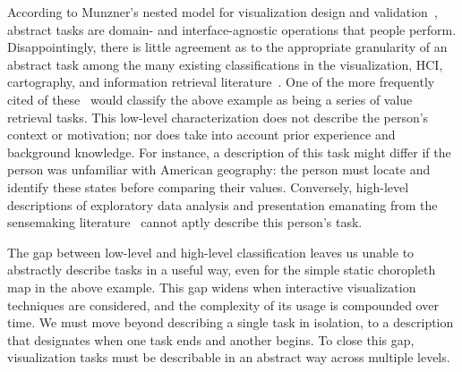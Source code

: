 According to Munzner's nested model for visualization design and validation~\cite{Munzner2009}, abstract tasks are domain- and interface-agnostic operations that people perform.
Disappointingly, there is little agreement as to the appropriate granularity of an abstract task among the many existing classifications in the visualization, \ac{HCI}, cartography, and information retrieval literature~\cite{Amar2005,Amar2004,Andrienko2006,Buja1996,Card1999,Casner1991,Chi1998,Chuah1996,Dix1998,Gotz2008,Heer2012,Keim2002,Klein2006,Lee2006,Liu2010,Mullins1993,Pike2009,Pirolli2005,Raskin2000,Roth2012,Roth2013,Roth1990,Shneiderman1996,Spence2007,Springmeyer1992,Tweedie1997,Valiati2006,Ward2004,Wehrend1990,Yi2007,Zhou1998}.
One of the more frequently cited of these~\cite{Amar2005} would classify the above example as being a series of value retrieval tasks.
This low-level characterization does not describe the person's context or motivation; nor does take into account prior experience and background knowledge.
For instance, a description of this task might differ if the person was unfamiliar with American geography: the person must locate and identify these states before comparing their values.
Conversely, high-level descriptions of exploratory data analysis and presentation emanating from the sensemaking literature~\cite{Amar2004,Card1999,Klein2006,Pirolli2005} cannot aptly describe this person's task.

The gap between low-level and high-level classification leaves us unable to abstractly describe tasks in a useful way, even for the simple static choropleth map in the above example.
This gap widens when interactive visualization techniques are considered, and the complexity of its usage is compounded over time.
We must move beyond describing a single task in isolation, to a description that designates when one task ends and another begins.
To close this gap, visualization tasks must be describable in an abstract way across multiple levels.


